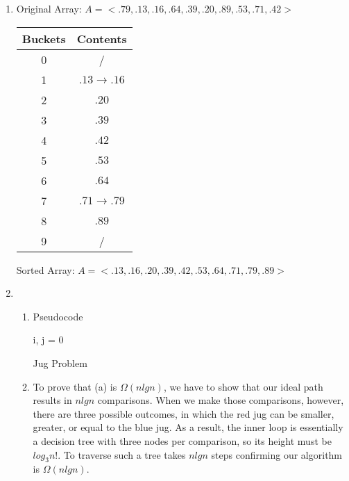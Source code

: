 \documentclass{article}
\begin{document}
\begin{enumerate}
\item Original Array: \(A = <.79, .13, .16, .64, .39, .20, .89, .53, .71, .42>\)\medskip

        \begin{center}
        \begin{tabular}[h]{|c|c|}
        \hline
             Buckets & Contents  \\
        \hline
                0    &   /\\
        \hline
                1    &   \(.13 \rightarrow .16 \)\\
        \hline
                2    &    \(.20\)\\
        \hline
                3    &      \(.39\)\\
        \hline
                4    &    \(.42\)\\
        \hline
                5    &    \(.53\)\\
        \hline
                6    &     \(.64\)\\
        \hline 
                7    &      \(.71 \rightarrow .79\)\\
        \hline
                8    &    \(.89\)\\
        \hline
                9    &    /\\
        \hline
        \end{tabular}
        \label{tab:my_label}
        \end{center}
        Sorted Array: \(A = <.13, .16, .20, .39, .42, .53, .64, .71, .79, .89>\)

\item

\begin{enumerate}[label=(\alph*)]
        \item Pseudocode\\
        \begin{minipage}{.7\linewidth}
            \begin{algorithm}[H]
            \SetAlgoLined
             i, j = 0\;
            \caption{Jug Problem}
            \end{algorithm}
            \end{minipage}
            \medskip
        \item To prove that (a) is \(\Omega(n lg n)\), we have to show that our ideal path results in \(n lg n\) comparisons. When we make those comparisons, however, there are three possible outcomes, in which the red jug can be smaller, greater, or equal to the blue jug. As a result, the inner loop is essentially a decision tree with three nodes per comparison, so its height must be \(log_3 n!\). To traverse such a tree takes \(n lg n\) steps confirming our algorithm is \(\Omega(n lg n)\).
    \end{enumerate}
    

\end{enumerate}
\end{document}
